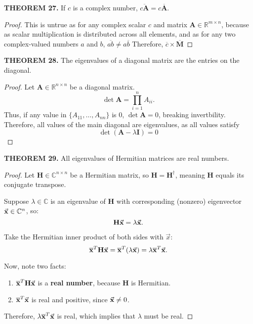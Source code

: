 \documentclass[12pt]{article}
\newcommand{\mat}[1]{\mathbf{#1}}
\newcommand{\theorem}[2]{\textbf{THEOREM #1.} #2}
\newcommand{\ct}[1]{\mat{\overline{#1}}^{T}}
\begin{document}
\theorem{27}{If $c$ is a complex number, $\overline{c\mat{A}} = c\overline{\mat{A}}$.}

\begin{proof}
This is untrue as for any complex scalar $c$ and matrix $\mat{A} \in \mathbb{R}^{m \times n}$, because as scalar multiplication is distributed across all elements, and as for any two complex-valued numbers $a$ and $b$, $\overline{ab} \ne a \overline{b}$ Therefore, $\overline{c} \times \overline{\mat{M}}$
\end{proof}

\theorem{28}{The eigenvalues of a diagonal matrix are the entries on the diagonal.}

\begin{proof}
Let $\mat{A} \in \mathbb{R}^{n \times n}$ be a diagonal matrix.
\begin{equation*}
\det \mat{A} = \prod_{i=1}^{n} A_{ii}.
\end{equation*}
Thus, if any value in $\{A_{11}, \dots, A_{nn}\}$ is 0, $\det \mat{A} = 0$, breaking invertbility. Therefore, all values of the main diagonal are eigenvalues, as all values satisfy
\begin{equation*}
\det( \mat{A} - \lambda \mat{I} ) = 0
\end{equation*} 
\end{proof}

\theorem{29}{All eigenvalues of Hermitian matrices are real numbers.}

%

\begin{proof}
Let \( \mat{H} \in \mathbb{C}^{n \times n} \) be a Hermitian matrix, so \( \mat{H} = \mat{H}^\dagger \), meaning \( \mat{H} \) equals its conjugate transpose.

Suppose \( \lambda \in \mathbb{C} \) is an eigenvalue of \( \mat{H} \) with corresponding (nonzero) eigenvector \( \va{x} \in \mathbb{C}^n \), so:
\[
\mat{H} \va{x} = \lambda \va{x}.
\]

Take the Hermitian inner product of both sides with \( \vec{x} \):
\[
\ct{x} \mat{H} \va{x} = \ct{x} (\lambda \va{x}) = \lambda \ct{x} \va{x}.
\]

Now, note two facts:
\begin{enumerate}
    \item \( \ct{x} \mat{H} \va{x} \) is a \textbf{real number}, because \( \mat{H} \) is Hermitian.
    \item \( \ct{x} \va{x} \) is real and positive, since \( \va{x} \ne 0 \).
\end{enumerate}

Therefore, \( \lambda \ct{x} \va{x} \) is real, which implies that \( \lambda \) must be real.
\end{proof}
\end{document}
